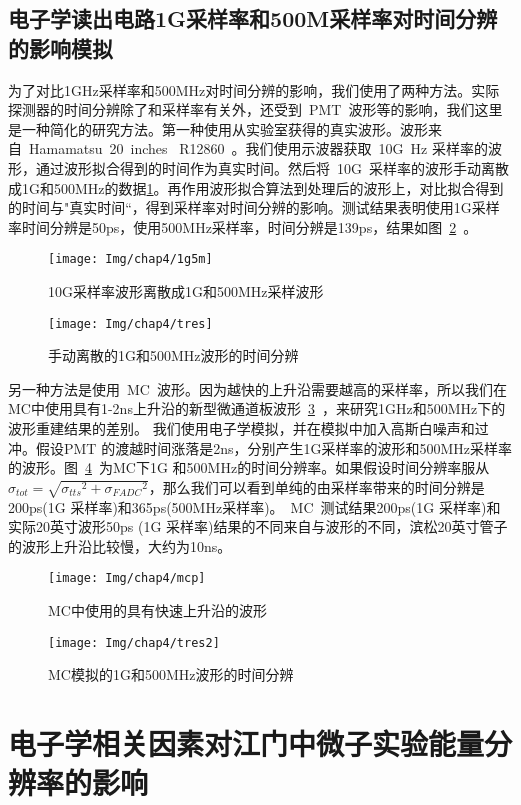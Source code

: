 \subsection{电子学读出电路1G采样率和500M采样率对时间分辨的影响模拟}
为了对比1GHz采样率和500MHz对时间分辨的影响，我们使用了两种方法。实际探测器的时间分辨除了和采样率有关外，还受到~PMT~波形等的影响，我们这里是一种简化的研究方法。第一种使用从实验室获得的真实波形。波形来自~Hamamatsu~20~inches~ R12860~。我们使用示波器获取~10G~Hz 采样率的波形，通过波形拟合得到的时间作为真实时间。然后将~10G~采样率的波形手动离散成1G和500MHz的数据\ref{fig:1g5m}。再作用波形拟合算法到处理后的波形上，对比拟合得到的时间与"真实时间“，得到采样率对时间分辨的影响。测试结果表明使用1G采样率时间分辨是50ps，使用500MHz采样率，时间分辨是139ps，结果如图~\ref{fig:tres}~。
  \begin{figure}[!htbp]
  \centering
   \texttt{[image: Img/chap4/1g5m]}
    \caption{ 10G采样率波形离散成1G和500MHz采样波形}
  \label{fig:1g5m}
\end{figure}
  \begin{figure}[!htbp]
  \centering
   \texttt{[image: Img/chap4/tres]}
    \caption{手动离散的1G和500MHz波形的时间分辨 }
  \label{fig:tres}
\end{figure}
另一种方法是使用~MC~波形。因为越快的上升沿需要越高的采样率，所以我们在MC中使用具有1-2ns上升沿的新型微通道板波形~\ref{fig:mcp}~，来研究1GHz和500MHz下的波形重建结果的差别。 我们使用电子学模拟，并在模拟中加入高斯白噪声和过冲。假设PMT 的渡越时间涨落是2ns，分别产生1G采样率的波形和500MHz采样率的波形。图~\ref{fig:tres2}~为MC下1G 和500MHz的时间分辨率。如果假设时间分辨率服从$\sigma_{tot}=\sqrt{{\sigma_{tts}}^2+{\sigma_{FADC}}^2}$，那么我们可以看到单纯的由采样率带来的时间分辨是200ps(1G 采样率)和365ps(500MHz采样率)。~MC~测试结果200ps(1G 采样率)和实际20英寸波形50ps (1G 采样率)结果的不同来自与波形的不同，滨松20英寸管子的波形上升沿比较慢，大约为10ns。
  \begin{figure}[!htbp]
  \centering
   \texttt{[image: Img/chap4/mcp]}
    \caption{MC中使用的具有快速上升沿的波形}
  \label{fig:mcp}
\end{figure}
  \begin{figure}[!htbp]
  \centering
   \texttt{[image: Img/chap4/tres2]}
    \caption{MC模拟的1G和500MHz波形的时间分辨 }
  \label{fig:tres2}
\end{figure}
\section{电子学相关因素对江门中微子实验能量分辨率的影响}

